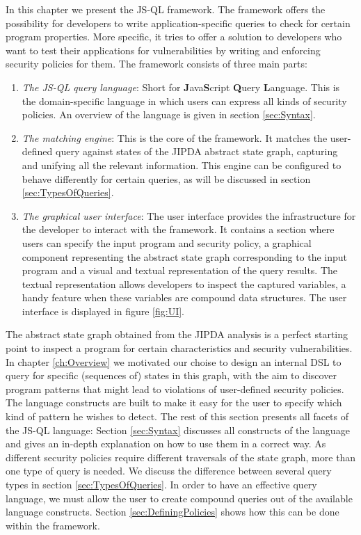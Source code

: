 In this chapter we present the JS-QL framework. The framework offers the possibility for developers to write application-specific queries to check for certain program properties. More specific, it tries to offer a solution to developers who want to test their applications for vulnerabilities by writing and enforcing security policies for them. The framework consists of three main parts: 
\begin{enumerate}
\item \textit{The JS-QL query language}: Short for \textbf{J}ava\textbf{S}cript \textbf{Q}uery \textbf{L}anguage. This is the domain-specific language in which users can express all kinds of security policies. An overview of the language is given in section \ref{sec:Syntax}.
\item \textit{The matching engine}: This is the core of the framework. It matches the user-defined query against states of the JIPDA abstract state graph, capturing and unifying all the relevant information. This engine can be configured to behave differently for certain queries, as will be discussed in section \ref{sec:TypesOfQueries}.
\item \textit{The graphical user interface}: The user interface provides the infrastructure for the developer to interact with the framework. It contains a section where users can specify the input program and security policy, a graphical component representing the abstract state graph corresponding to the input program and a visual and textual representation of the query results. The textual representation allows developers to inspect the captured variables, a handy feature when these variables are compound data structures. The user interface is displayed in figure \ref{fig:UI}.
\end{enumerate}

The abstract state graph obtained from the JIPDA analysis is a perfect starting point to inspect a program for certain characteristics and security vulnerabilities. In chapter \ref{ch:Overview} we motivated our choise to design an internal DSL to query for specific (sequences of) states in this graph, with the aim to discover program patterns that might lead to violations of user-defined security policies. The language constructs are built to make it easy for the user to specify which kind of pattern he wishes to detect. The rest of this section presents all facets of the JS-QL language: Section \ref{sec:Syntax} discusses all constructs of the language and gives an in-depth explanation on how to use them in a correct way. As different security policies require different traversals of the state graph, more than one type of query is needed. We discuss the difference between several query types in section \ref{sec:TypesOfQueries}. In order to have an effective query language, we must allow the user to create compound queries out of the available language constructs. Section \ref{sec:DefiningPolicies} shows how this can be done within the framework.

